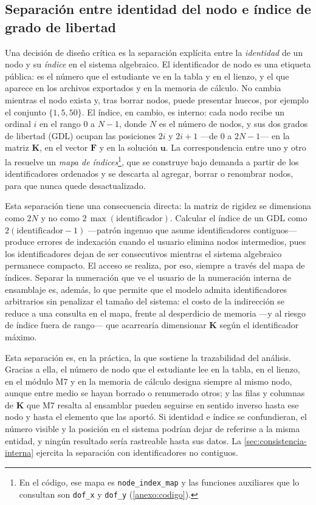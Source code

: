 \subsection{Separación entre identidad del nodo e índice de grado de libertad}
\label{sec:identidad-gdl}

Una decisión de diseño crítica es la separación explícita entre la \emph{identidad} de un nodo y su \emph{índice} en el sistema algebraico. El identificador de nodo es una etiqueta pública: es el número que el estudiante ve en la tabla y en el lienzo, y el que aparece en los archivos exportados y en la memoria de cálculo. No cambia mientras el nodo exista y, tras borrar nodos, puede presentar huecos, por ejemplo el conjunto $\{1, 5, 50\}$. El índice, en cambio, es interno: cada nodo recibe un ordinal $i$ en el rango $0$ a $N-1$, donde $N$ es el número de nodos, y sus dos grados de libertad (GDL) ocupan las posiciones $2i$ y $2i+1$ —de $0$ a $2N-1$— en la matriz $\bm{K}$, en el vector $\bm{F}$ y en la solución $\bm{u}$. La correspondencia entre uno y otro la resuelve un \emph{mapa de índices}\footnote{En el código, ese mapa es \texttt{node\_index\_map} y las funciones auxiliares que lo consultan son \texttt{dof\_x} y \texttt{dof\_y} (\autoref{anexo:codigo}).}, que se construye bajo demanda a partir de los identificadores ordenados y se descarta al agregar, borrar o renombrar nodos, para que nunca quede desactualizado.

Esta separación tiene una consecuencia directa: la matriz de rigidez se dimensiona como $2N$ y no como $2\,\max(\text{identificador})$. Calcular el índice de un GDL como $2(\text{identificador}-1)$ —patrón ingenuo que asume identificadores contiguos— produce errores de indexación cuando el usuario elimina nodos intermedios, pues los identificadores dejan de ser consecutivos mientras el sistema algebraico permanece compacto. El acceso se realiza, por eso, siempre a través del mapa de índices. Separar la numeración que ve el usuario de la numeración interna de ensamblaje es, además, lo que permite que el modelo admita identificadores arbitrarios sin penalizar el tamaño del sistema: el costo de la indirección se reduce a una consulta en el mapa, frente al desperdicio de memoria —y al riesgo de índice fuera de rango— que acarrearía dimensionar $\bm{K}$ según el identificador máximo.

Esta separación es, en la práctica, la que sostiene la trazabilidad del análisis. Gracias a ella, el número de nodo que el estudiante lee en la tabla, en el lienzo, en el módulo M7 y en la memoria de cálculo designa siempre al mismo nodo, aunque entre medio se hayan borrado o renumerado otros; y las filas y columnas de $\bm{K}$ que M7 resalta al ensamblar pueden seguirse en sentido inverso hasta ese nodo y hasta el elemento que las aportó. Si identidad e índice se confundieran, el número visible y la posición en el sistema podrían dejar de referirse a la misma entidad, y ningún resultado sería rastreable hasta sus datos. La \autoref{sec:consistencia-interna} ejercita la separación con identificadores no contiguos.

